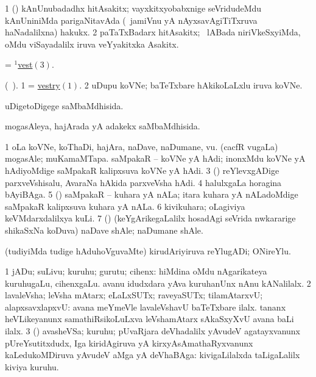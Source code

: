 \bentry
{} 
\gl{\nA}
\expl{}
\bmng
\bnum
\num{1} (\nAyxshA) kAnUnubadadhx hitAsakitx; vayxkitxyobabxnige seVridudeMdu kAnUniniMda parigaNitavAda (\sA\ jamiVnu yA nAyxsavAgiTiTxruva haNadalilxna) hakukx. 
\num{2} paTaTxBadarx hitAsakitx; \sA\ lABada niriVkeSxyiMda, oMdu viSayadalilx iruva veYyakitxka Asakitx. 
\enum
\emng
\eentry

\bentry
{} 
\gl{\nA}
\expl{}
\bmng
 = \hyperlink{vest(1)3}{$^1$vest\((3)\)}. 
\emng
\eentry

\bentry
{} 
\gl{\nA}(\bava\ ). 
\bmng
\bnum
\num{1} = \hyperlink{vestry}{vestry\((1)\)}. 
\num{2} uDupu koVNe; baTeTxbare hAkikoLaLxlu iruva koVNe. 
\enum
\emng
\eentry

\bentry
{} 
\gl{\gu}
\expl{}
\bmng
 uDigetoDigege saMbaMdhisida. 
\emng
\eentry

\bentry
{} 
\gl{\gu}
\expl{}
\bmng
 mogasAleya, hajArada yA adakekx saMbaMdhisida. 
\emng
\eentry

\bentry
{} 
\gl{\nA}
\expl{}
\bmng
\bnum
\num{1} oLa koVNe, koThaDi, hajAra, naDave, naDumane, \mo vu. 
\banum
{} (cacfR \mo vugaLa) mogasAle; muKamaMTapa. 
 saMpakaR -- koVNe yA hAdi; inonxMdu koVNe yA hAdiyoMdige saMpakaR kalipxsuva koVNe yA hAdi. 
\eanum
\numie
\num{3} (\ame) reYlevxgADige parxveVshisalu, AvaraNa hAkida parxveVsha hAdi. 
\num{4} halulxgaLa horagina bAyiBAga. 
\num{5} (\aMrashA) saMpakaR -- kuhara yA nALa; itara kuhara yA nALadoMdige saMpakaR kalipxsuva kuhara yA nALa. 
\num{6} kivikuhara; oLagiviya keVMdarxdalilxya kuLi. 
\num{7} (\ame) (keYgArikegaLalilx hosadAgi seVrida nwkararige shikaSxNa koDuva) naDave shAle; naDumane shAle. 
\enum
\emng
\eentry

\bentry
{} 
\gl{\nA}
\expl{}
\bmng
 (tudiyiMda tudige hAduhoVguvaMte) kirudAriyiruva reYlugADi; ONireYlu. 
\emng
\eentry

\bentry
{} 
\gl{\nA}
\expl{}
\bmng
\bnum
\num{1} jADu; suLivu; kuruhu; gurutu; cihenx:  hiMdina oMdu nAgarikateya kuruhugaLu, cihenxgaLu.  avanu idudxdara yAva kuruhanUnx nAnu kANalilalx. 
\num{2} lavaleVsha; leVsha mAtarx; eLaLxSUTx; raveyaSUTx; tilamAtarxvU; alapxsavxlapxvU:  avana meYmeVle lavaleVshavU baTeTxbare ilalx.  tananx heVLikeyanunx samathiRsikoLuLxva leVshamAtarx sAkaSxyXvU avana baLi ilalx. 
\num{3} (\jiVvi) avasheVSa; kuruhu; pUvaRjara deVhadalilx yAvudeV agatayxvanunx pUreYsutitxdudx, Iga kiridAgiruva yA kirxyAsAmathaRyxvanunx kaLedukoMDiruva yAvudeV aMga yA deVhaBAga:  kivigaLilalxda taLigaLalilx kiviya kuruhu. 
\enum
\emng
\eentry

